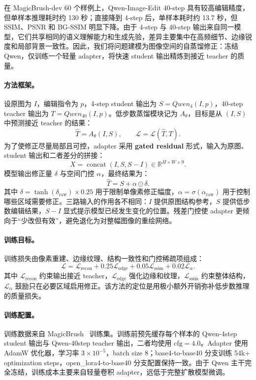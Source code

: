 \documentclass[UTF8,11pt,a4paper,fontset=fandol]{ctexart}
\begin{document}
在 MagicBrush-dev 60 个样例上，Qwen-Image-Edit 40-step 具有较高编辑精度，但单样本推理耗时约 130 秒；直接降到 4-step 后，单样本耗时约 13.7 秒，但 SSIM、PSNR 和 BG-SSIM 明显下降。由于 4-step 与 40-step 输出来自同一模型，它们共享相同的语义理解能力和生成先验，差异主要集中在高频细节、边缘锐度和局部背景一致性。因此，我们将问题建模为图像空间的自蒸馏修正：冻结 Qwen，仅训练一个轻量 adapter，将快速 student 输出精炼到接近 teacher 的质量。

\paragraph{方法框架。}
设原图为 $I$，编辑指令为 $p$，4-step student 输出为 $S=Qwen_4(I,p)$，40-step teacher 输出为 $T=Qwen_{40}(I,p)$。低步数蒸馏模块记为 $A_\theta$，目标是从 $(I,S)$ 中预测接近 teacher 的结果：
\[
\hat T=A_\theta(I,S),\qquad
\mathcal{L}=\mathcal{L}(\hat T,T).
\]
为了使修正尽量局部且可控，adapter 采用 \textbf{gated residual} 形式，输入为原图、student 输出和二者差分的拼接：
\[
X=\operatorname{concat}(I,S,S-I)\in\mathbb{R}^{H\times W\times 9}.
\]
模型输出修正量 $\delta$ 与空间门控 $\alpha$，最终结果为：
\[
\hat T=S+\alpha\odot\delta.
\]
其中 $\delta=\tanh(\delta_{\mathrm{raw}})\times0.25$ 用于限制单像素修正幅度，$\alpha=\sigma(\alpha_{\mathrm{raw}})$ 用于控制哪些区域需要修正。三路输入的作用各不相同：$I$ 提供原图结构参考，$S$ 提供低步数编辑结果，$S-I$ 显式提示模型已经发生变化的位置。残差门控使 adapter 更倾向于“少改但有效”，避免退化为对整幅图像的重绘网络。

\paragraph{训练目标。}
训练损失由像素重建、边缘纹理、结构一致性和门控稀疏项组成：
\[
\mathcal{L}
=\mathcal{L}_{\mathrm{recon}}
+0.25\mathcal{L}_{\mathrm{edge}}
+0.05\mathcal{L}_{\mathrm{ssim}}
+0.02\mathcal{L}_{\alpha}.
\]
其中 $\mathcal{L}_{\mathrm{recon}}$ 约束输出接近 teacher，$\mathcal{L}_{\mathrm{edge}}$ 强化边缘和纹理，$\mathcal{L}_{\mathrm{ssim}}$ 约束整体结构，$\mathcal{L}_{\alpha}$ 鼓励只在必要区域启用修正。该方法的定位是用极小额外开销弥补低步数推理的质量损失。

\paragraph{训练配置。}
训练数据来自 MagicBrush~\cite{magicbrush} 训练集。训练前预先缓存每个样本的 Qwen-4step student 输出与 Qwen-40step teacher 输出，二者均使用 $\mathrm{cfg}=4.0$。Adapter 使用 AdamW 优化器，学习率 $3\times10^{-5}$，batch size 8；base4-to-base40 分支训练 54k+ optimization steps，open\_lora4-to-base40 分支配置保持一致。由于 Qwen 主干完全冻结，训练成本主要来自轻量卷积 adapter，远低于完整扩散模型微调。
\end{document}
